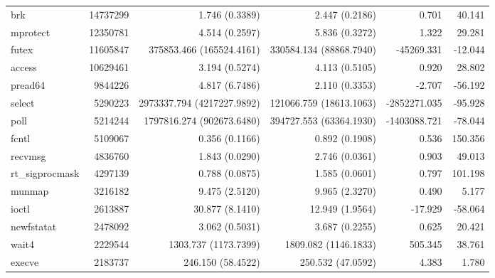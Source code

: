 \begin{longtable}{>{\ttfamily}lrrrrr}
                            brk &   14737299 &              1.746 (0.3389) &            2.447 (0.2186) &           0.701 &       40.141 \\
                       mprotect &   12350781 &              4.514 (0.2597) &            5.836 (0.3272) &           1.322 &       29.281 \\
                          futex &   11605847 &    375853.466 (165524.4161) &   330584.134 (88868.7940) &      -45269.331 &      -12.044 \\
                         access &   10629461 &              3.194 (0.5274) &            4.113 (0.5105) &           0.920 &       28.802 \\
                        pread64 &    9844226 &              4.817 (6.7486) &            2.110 (0.3353) &          -2.707 &      -56.192 \\
                         select &    5290223 &  2973337.794 (4217227.9892) &   121066.759 (18613.1063) &    -2852271.035 &      -95.928 \\
                           poll &    5214244 &   1797816.274 (902673.6480) &   394727.553 (63364.1930) &    -1403088.721 &      -78.044 \\
                          fcntl &    5109067 &              0.356 (0.1166) &            0.892 (0.1908) &           0.536 &      150.356 \\
                        recvmsg &    4836760 &              1.843 (0.0290) &            2.746 (0.0361) &           0.903 &       49.013 \\
                rt\_sigprocmask &    4297139 &              0.788 (0.0875) &            1.585 (0.0601) &           0.797 &      101.198 \\
                         munmap &    3216182 &              9.475 (2.5120) &            9.965 (2.3270) &           0.490 &        5.177 \\
                          ioctl &    2613887 &             30.877 (8.1410) &           12.949 (1.9564) &         -17.929 &      -58.064 \\
                     newfstatat &    2478092 &              3.062 (0.5031) &            3.687 (0.2255) &           0.625 &       20.421 \\
                          wait4 &    2229544 &        1303.737 (1173.7399) &      1809.082 (1146.1833) &         505.345 &       38.761 \\
                         execve &    2183737 &           246.150 (58.4522) &         250.532 (47.0592) &           4.383 &        1.780 \\

\end{longtable}
